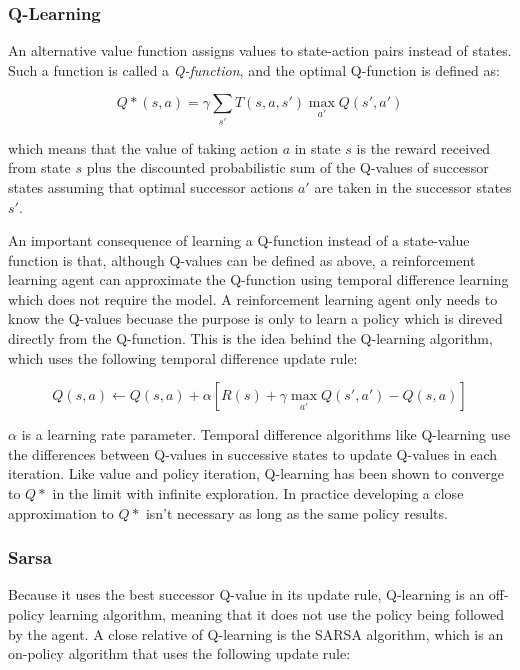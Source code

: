 \subsubsection{Q-Learning}

An alternative value function assigns values to state-action pairs instead of states. Such a function is called a {\it Q-function}, and the optimal Q-function is defined as:

\begin{equation}
Q*(s, a) = \gamma \sum_{s'} T(s, a, s') \max_{a'} Q(s', a')
\end{equation}

which means that the value of taking action $a$ in state $s$ is the reward received from state $s$ plus the discounted probabilistic sum of the Q-values of successor states assuming that optimal successor actions $a'$ are taken in the successor states $s'$.

An important consequence of learning a Q-function instead of a state-value function is that, although Q-values can be defined as above, a reinforcement learning agent can approximate the Q-function using temporal difference learning which does not require the model. A reinforcement learning agent only needs to know the Q-values becuase the purpose is only to learn a policy which is direved directly from the Q-function. This is the idea behind the Q-learning algorithm, which uses the following temporal difference update rule:

\begin{equation}
Q(s, a) \leftarrow Q(s, a) + \alpha [R(s) + \gamma \max_{a'} Q(s', a') - Q(s, a)]
\end{equation}

$\alpha$ is a learning rate parameter. Temporal difference algorithms like Q-learning use the differences between Q-values in successive states to update Q-values in each iteration. Like value and policy iteration, Q-learning has been shown to converge to $Q*$ in the limit with infinite exploration. In practice developing a close approximation to $Q*$ isn't necessary as long as the same policy results.

\subsubsection{Sarsa}

Because it uses the best successor Q-value in its update rule, Q-learning is an off-policy learning algorithm, meaning that it does not use the policy being followed by the agent. A close relative of Q-learning is the SARSA algorithm, which is an on-policy algorithm that uses the following update rule:

